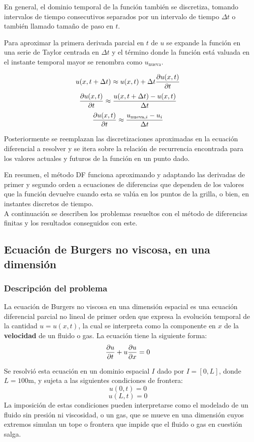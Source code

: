 \documentclass[12pt]{article}
\begin{document}
	
	En general, el dominio temporal de la función también se discretiza, tomando intervalos de tiempo consecutivos separados por un intervalo de tiempo $\Delta t$ o también llamado tamaño de paso en $t$. 
	
	\newpage
	Para aproximar la primera derivada parcial en $t$ de $u$ se expande la función en una serie de Taylor centrada en $\Delta t$ y el término donde la función está valuada en el instante temporal mayor se renombra como $u_{\text{nueva}}$.
	
	\[u(x,t+\Delta t)\approx u(x,t) + \Delta t \pdv{u(x,t)}{t}\]
	\[\pdv{u(x,t)}{t} \approx \frac{u(x,t+\Delta t) - u(x,t)}{\Delta t}\]
	\[\pdv{u(x,t)}{t} \approx \frac{u_{\text{nueva,} i} - u_{i}}{\Delta t}\]
	
	Posteriormente se reemplazan las discretizaciones aproximadas en la ecuación diferencial a resolver y se itera sobre la relación de recurrencia encontrada para los valores actuales y futuros de la función en un punto dado. 
	
	En resumen, el método DF funciona aproximando y adaptando las derivadas de primer y segundo orden a ecuaciones de diferencias que dependen de los valores que la función devuelve cuando esta se valúa en los puntos de la grilla, o bien, en instantes discretos de tiempo.\\
	
	A continuación se describen los problemas resueltos con el método de diferencias finitas y los resultados conseguidos con este.

	
	\subsection{Ecuación de Burgers no viscosa, en una dimensión}
	\label{sec:burgers1ddf}
	\subsubsection{Descripción del problema}
	La ecuación de Burgers no viscosa en una dimensión espacial es una ecuación diferencial parcial no lineal de primer orden que expresa la evolución temporal de la cantidad $u = u(x,t)$, la cual se interpreta como la componente en $x$ de la \textbf{velocidad} de un fluido o gas. La ecuación tiene la siguiente forma:
	\begin{equation}
		\pdv{u}{t}+u\pdv{u}{x}=0
		\label{eq:burgers1d}
	\end{equation}
	
	Se resolvió esta ecuación en un dominio espacial $I$ dado por $I = [0,L]$, donde $L = 100 \unit{\meter}$, y sujeta a las siguientes condiciones de frontera:\\
	\begin{equation}
		u(0,t)=0
	\end{equation}
	\begin{equation}
		u(L,t)= 0
	\end{equation}
	La imposición de estas condiciones pueden interpretarse como el modelado de un fluido sin presión ni viscosidad, o un gas, que se mueve en una dimensión cuyos extremos simulan un tope o frontera que impide que el fluido o gas en cuestión salga. 
	
\end{document}
